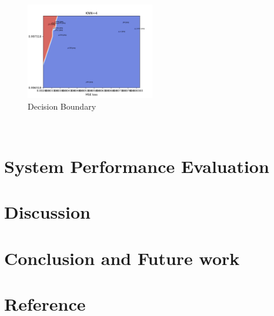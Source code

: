 \documentclass[runningheads]{llncs}
\begin{document}
\begin{figure}
    \centering
    \includegraphics[width=0.5\textwidth]{decision-boundary.png}
    \caption{Decision Boundary}
    \label{fig:7}
\end{figure}\\

\section{System Performance Evaluation}

\section{Discussion}

\section{Conclusion and Future work}

\section{Reference}
\end{document}
